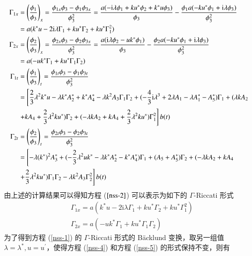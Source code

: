 \begin{align}
\Gamma_{1x} &= \left(\frac{\phi_1}{\phi_3}\right)_x=\frac{\phi_{1x}\phi_3-\phi_1\phi_{3x}}{\phi_3^2}=\frac{a(-\mathrm{i}\lambda\phi_1+ku^*\phi_2+k^*u\phi_3)}{\phi_3}-\frac{\phi_1a(-ku^*\phi_1+\mathrm{i}\lambda\phi_3)}{\phi_3^2} \nonumber\\
  &= a(k^{*}u - 2\mathrm{i}\lambda \Gamma_{1} + ku^{*}\Gamma_{2} + ku^{*}\Gamma_{1}^{2}) \label{nss-g1x} \\
  \Gamma_{2x} &=\left(\frac{\phi_2}{\phi_3}\right)_x=\frac{\phi_{2x}\phi_3-\phi_2\phi_{3x}}{\phi_3^2}=\frac{a(\mathrm{i}\lambda\phi_2-uk^*\phi_1)}{\phi_3}-\frac{\phi_2a(-ku^*\phi_1+\mathrm{i}\lambda\phi_3)}{\phi_3^2}\nonumber\\
  &= a(-uk^{*}\Gamma_{1} + ku^{*}\Gamma_{1}\Gamma_{2}) \label{nss-g2x} \\
  \Gamma_{1t} &= \left(\frac{\phi_1}{\phi_3}\right)_t=\frac{\phi_{1t}\phi_3-\phi_1\phi_{3t}}{\phi_3^2} \notag \\
  &= \left[\frac{2}{3}\lambda^{2}k^{*}u - \lambda k^{*}A_{2}^{*} + k^{*}A_{4}^{*} - \lambda k^{2}A_{3}\Gamma_{1}\Gamma_{2} + (-\frac{4}{3}\mathrm{i}\lambda^{3} + 2\lambda A_{1} - \lambda A_{1}^{*} - A_{5}^{*})\Gamma_{1} + (\lambda kA_{2} \right. \notag\\
  & \left. + kA_{4} + \frac{2}{3}\lambda^{2}ku^{*})\Gamma_{2} + (-\lambda kA_{2} + kA_{4} + \frac{2}{3}\lambda^{2}ku^{*})\Gamma_{1}^{2}\right] b(t)  \label{nss-g1t} \\
  \Gamma_{2t} &=\left(\frac{\phi_2}{\phi_3}\right)_t=\frac{\phi_{2t}\phi_3-\phi_2\phi_{3t}}{\phi_3^2} \notag \\
  &= \left[ -\lambda(k^{*})^{2}A_{3}^{*} + (-\frac{2}{3}\lambda^{2}uk^{*} - \lambda k^{*}A_{2}^{*} - k^{*}A_{4}^{*})\Gamma_{1} + (A_{5}+A_{5}^{*})\Gamma_{2} + (-\lambda kA_{2} +kA_{4} \right. \notag\\
  & \left. + \frac{2}{3}\lambda^{2}ku^{*})\Gamma_{1}\Gamma_{2} - \lambda k^{2}A_{3}\Gamma_{2}^{2} \right] b(t) \label{nss-g2t}
\end{align}
由上述的计算结果可以得知方程 ($\ref{nss-2}$) 可以表示为如下的 $\Gamma$-Riccati 形式
\begin{align}
  & \Gamma_{1x} = a(k^{*}u - 2\mathrm{i}\lambda \Gamma_{1} + ku^{*}\Gamma_{2} + ku^{*}\Gamma_{1}^{2}) \label{nss-4} \\
  & \Gamma_{2x} = a(-uk^{*}\Gamma_{1} + ku^{*}\Gamma_{1}\Gamma_{2}) \label{nss-5}
\end{align}
为了得到方程 (\ref{nss-1}) 的 $\Gamma$-Riccati 形式的 B\"acklund 变换，取另一组值 $\lambda = \lambda^{*}, u = u^{'}$，使得方程 (\ref{nss-4}) 和方程 (\ref{nss-5}) 的形式保持不变，则有
